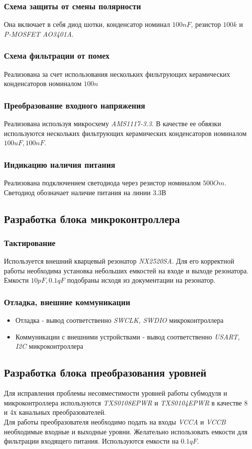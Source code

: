 \subsubsection{Схема защиты от смены полярности}
Она включает в себя диод шотки, конденсатор номинал $100nF$, резистор $100k$ и \textit{P-MOSFET AO3401A}.

\subsubsection{Схема фильтрации от помех}
Реализована за счет использования нескольких фильтрующих керамических конденсаторов номиналом $100n$

\subsubsection{Преобразование входного напряжения}
Реализована используя микросхему \textit{AMS1117-3.3}. В качестве ее обвязки используются нескольких фильтрующих керамических конденсаторов номиналом $100uF, 100nF$.

\subsubsection{Индикацию наличия питания}
Реализована подключением светодиода через резистор номиналом $500 Om$. Светодиод обозначает наличие питания на линии $3.3В$

\subsection{Разработка блока микроконтроллера}
\subsubsection{Тактирование}
Используется внешний кварцевый резонатор \textit{NX2520SA}. Для его корректной работы необходима установка небольших емкостей на входе и выходе резонатора. Емкости $10pF, 0.1qF$ подобраны исходя из документации на резонатор. 
\subsubsection{Отладка, внешние коммуникации}
\begin{itemize}
    \item Отладка - вывод соответственно \textit{SWCLK, SWDIO} микроконтроллера
    \item Коммуникации с внешними устройствами - вывод соответственно \textit{USART, I2C} микроконтроллера
\end{itemize}


\subsection{Разработка блока преобразования уровней}
Для исправления проблемы несовместимости уровней работы субмодуля и микроконтроллера используются \textit{TXS0108EPWR} и \textit{TXS0104EPWR} в качестве 8 и 4х канальных преобразователей.\\
Для работы преобразователя необходимо подать на входы \textit{VCCA} и \textit{VCCB} необходимые входные и выходные уровни. Желательно использовать емкости для фильтрации входящего питания. Используются емкости на $0.1qF$.